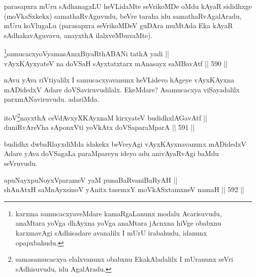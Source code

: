 \begin{artha}
parasapxra mUru sAdhanagaLU heVLidaMte seVrikoMDe oMdu kAyaR sididhxge
(moVkaSxkekx) samathaRvAguvudu, beVre taraha idu samathaRvAgalAradu,
mUru koVlugaLu (parasapxra seVrikoMDeV guDAra muMtAda Eka kAyaR
sAdhakavAguvavu, anayxthA ilalxveMbuvaMte).
\end{artha}



\begin{shl}
\footnote{karxma samucacxyaveMdare kamaRgaLanunx modalu Acarisuvudu, anaMtara yoVga dhAyxna yoVga anaMtara jAcnxna hiVge obabxnu karxmavAgi sAdhisadare avanalilx I mUrU irabahudu, idanunx opapxbahudu.}samucacxyoV\s yamasAmxBiyaRthA\s BANi tathA yadi ||  \\
vAyxKAyxyateV na doVSaH sAyxtatxtarx mAnasayx saMBavAtf \hfill || 590 ||  
\end{shl}

\begin{artha}
nAvu yAva riVtiyalilx I samucacxyavanunx heVLidevo hAgeye vAyxKAyxna mADidedxV Adare doVSaviruvudilalx. EkeMdare? A\break samucacxya viSayadalilx parxmANaviruvudu. adariMda.
\end{artha}



\begin{shl}
itoV\s \footnote{samasamucacxya elalxvanunx obabxnu EkakAladalilx I mUranunx seVri sAdhisuvudu, idu AgalAradu.}nayxthA ceVdAvxyXKAyxnaM kirxyateV budidhxlAGavAtf || \\
duniRvAreVha sA\s \s ponxVti yoVkAtx doVSaparaMparA \hfill || 591 ||  
\end{shl}

\begin{artha}
budidhx dwbaRlayxdiMda idakekx beVreyAgi vAyxKAyxnavanunx mADidedxV Adare yAva doVSagaLa paraMpareyu ideyo adu anivAyaRvAgi baMdu seVruvudu.
\end{artha}


\begin{shl}
apuNayxpuNoyxVparameV yaM punaBaRvaniBaRyAH || \\
shAnAtxH saMnAyxsinoV yAnitx tasemxY moVkASxtamxneV namaH \hfill || 592 ||  
\end{shl}

